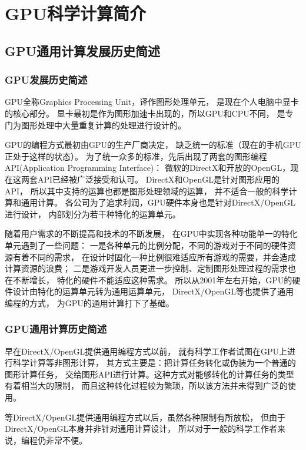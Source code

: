 


\chapter{GPU科学计算简介}

\section{GPU通用计算发展历史简述}

\subsection{GPU发展历史简述}
GPU全称Graphics Processing Unit，译作图形处理单元，
是现在个人电脑中显卡的核心部分。
显卡最初是作为图形加速卡出现的，所以GPU和CPU不同，
是专门为图形处理中大量重复计算的处理进行设计的。

GPU的编程方式最初由GPU的生产厂商决定，
缺乏统一的标准（现在的手机GPU正处于这样的状态）。
为了统一众多的标准，先后出现了两套的图形编程API(Application Programming Interface)：
微软的DirectX和开放的OpenGL，现在这两套API已经被广泛接受和认可。
DirectX和OpenGL是针对图形应用的API，
所以其中支持的运算也都是图形处理领域的运算，
并不适合一般的科学计算和通用计算。
各公司为了追求利润，GPU硬件本身也是针对DirectX/OpenGL进行设计，
内部划分为若干种特化的运算单元。

随着用户需求的不断提高和技术的不断发展，
在GPU中实现各种功能单一的特化单元遇到了一些问题：
一是各种单元的比例分配，不同的游戏对于不同的硬件资源有着不同的需求，
在设计时固化一种比例很难适应所有游戏的需要，并会造成计算资源的浪费；
二是游戏开发人员更进一步控制、定制图形处理过程的需求也在不断增长，
特化的硬件不能适应这种需求。
所以从2001年左右开始，GPU的硬件设计由特化的运算单元转为通用运算单元，
DirectX/OpenGL等也提供了通用编程的方式，
为GPU的通用计算打下了基础。

\subsection{GPU通用计算历史简述}

早在DirectX/OpenGL提供通用编程方式以前，
就有科学工作者试图在GPU上进行科学计算等非图形计算，
其方式主要是：把计算任务转化或伪装为一个普通的图形计算任务，
交给图形API进行计算。这种方式对能够转化的计算任务的类型有着相当大的限制，
而且这种转化过程较为繁琐，所以该方法并未得到广泛的使用。

等DirectX/OpenGL提供通用编程方式以后，虽然各种限制有所放松，
但由于DirectX/OpenGL本身并非针对通用计算设计，
所以对于一般的科学工作者来说，编程仍非常不便。


